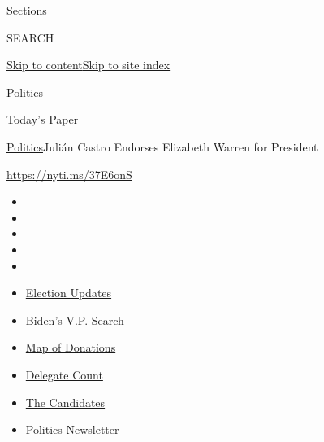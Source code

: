 Sections

SEARCH

\protect\hyperlink{site-content}{Skip to
content}\protect\hyperlink{site-index}{Skip to site index}

\href{https://www.nytimes.com/section/politics}{Politics}

\href{https://myaccount.nytimes.com/auth/login?response_type=cookie\&client_id=vi}{}

\href{https://www.nytimes.com/section/todayspaper}{Today's Paper}

\href{/section/politics}{Politics}\textbar{}Julián Castro Endorses
Elizabeth Warren for President

\url{https://nyti.ms/37E6onS}

\begin{itemize}
\item
\item
\item
\item
\item
\end{itemize}

\begin{itemize}
\item
  \href{https://www.nytimes.com/2020/07/31/us/elections/biden-vs-trump.html?action=click\&pgtype=Article\&state=default\&region=TOP_BANNER\&context=storylines_menu}{Election
  Updates}
\item
  \href{https://www.nytimes.com/article/biden-vice-president-2020.html?action=click\&pgtype=Article\&state=default\&region=TOP_BANNER\&context=storylines_menu}{Biden's
  V.P. Search}
\item
  \href{https://www.nytimes.com/interactive/2020/07/24/us/politics/trump-biden-campaign-donors.html?action=click\&pgtype=Article\&state=default\&region=TOP_BANNER\&context=storylines_menu}{Map
  of Donations}
\item
  \href{https://www.nytimes.com/interactive/2020/us/elections/delegate-count-primary-results.html?action=click\&pgtype=Article\&state=default\&region=TOP_BANNER\&context=storylines_menu}{Delegate
  Count}
\item
  \href{https://www.nytimes.com/interactive/2019/us/politics/2020-presidential-candidates.html?action=click\&pgtype=Article\&state=default\&region=TOP_BANNER\&context=storylines_menu}{The
  Candidates}
\item
  \href{https://www.nytimes.com/newsletters/politics?action=click\&pgtype=Article\&state=default\&region=TOP_BANNER\&context=storylines_menu}{Politics
  Newsletter}
\end{itemize}

